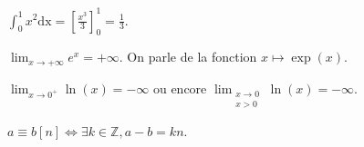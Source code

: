 $\int_0^1 x^2 \mathrm{dx} = \left[\frac{x^3}{3}\right]_0^1 = \frac 13$.\medskip

$\lim_{x \to +\infty} e^x= +\infty$. On parle de la fonction $x \mapsto \exp(x)$.\medskip

$\lim_{x \to 0^+}\ln(x) = -\infty$ ou encore $\lim_{\substack{x \to 0 \\ x > 0}}\ln(x) = -\infty$.\medskip

$a \equiv b [n] \Leftrightarrow \exists k \in \mathds Z, a - b = kn$.